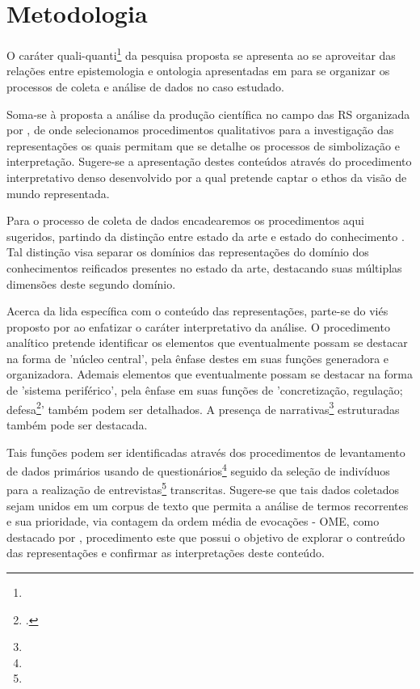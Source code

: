 \documentclass[
  12pt,       %
  openright,      %
  twoside,      %
  a4paper,      %
  english,      %
  french,       %
  spanish,      %
  brazil        %
  ]{abntex2}
\begin{document}
\chapter{Metodologia}

O caráter quali-quanti\footnote{} da pesquisa proposta se apresenta ao se aproveitar das relações entre epistemologia e ontologia apresentadas em  para se organizar os processos de coleta e análise de dados no caso estudado.

Soma-se à proposta a análise da produção científica no campo das RS organizada por , de onde selecionamos procedimentos qualitativos para a investigação das representações os quais permitam que se detalhe os processos de simbolização e interpretação. Sugere-se a apresentação destes conteúdos através do procedimento interpretativo denso desenvolvido por  a qual pretende captar o ethos da visão de mundo representada.

Para o processo de coleta de dados encadearemos os procedimentos aqui sugeridos, partindo da distinção entre estado da arte e estado do conhecimento . Tal distinção visa separar os domínios das representações do domínio dos conhecimentos reificados presentes no estado da arte, destacando suas múltiplas dimensões deste segundo domínio.

Acerca da lida específica com o conteúdo das representações, parte-se do viés proposto por  ao enfatizar o caráter interpretativo da análise. O procedimento analítico pretende identificar os elementos que eventualmente possam se destacar na forma de 'núcleo central', pela ênfase destes em suas funções generadora e organizadora. Ademais elementos que eventualmente possam se destacar na forma de 'sistema periférico', pela ênfase em suas funções de 'concretização, regulação; defesa\footnote{.}' também podem ser detalhados. A presença de narrativas\footnote{} estruturadas também pode ser destacada.

Tais funções podem ser identificadas através dos procedimentos de levantamento de dados primários usando de questionários\footnote{} seguido da seleção de indivíduos para a realização de entrevistas\footnote{} transcritas. Sugere-se que tais dados coletados sejam unidos em um corpus de texto que permita a análise de termos recorrentes e sua prioridade, via contagem da ordem média de evocações - OME, como destacado por , procedimento este que possui o objetivo de explorar o contreúdo das representações e confirmar as interpretações deste conteúdo.
\end{document}
